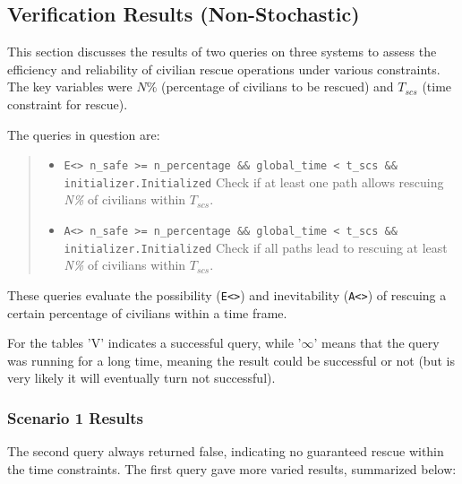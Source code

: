 \subsection{Verification Results (Non-Stochastic)}

This section discusses the results of two queries on three systems to assess the efficiency and reliability of civilian rescue operations under various constraints. The key variables were $N\%$ (percentage of civilians to be rescued) and $T_{scs}$ (time constraint for rescue).

The queries in question are:


\begin{quote}
	\raggedright
	\begin{itemize}
		\item \texttt{E<> n\_safe >= n\_percentage \&\& global\_time < t\_scs \&\& initializer.Initialized}\newline
                Check if at least one path allows rescuing \textit{N\%} of civilians within $T_{scs}$.
		\item \texttt{A<> n\_safe >= n\_percentage \&\& global\_time < t\_scs \&\& initializer.Initialized}\newline
                Check if all paths lead to rescuing at least \textit{N\%} of civilians within $T_{scs}$.
	\end{itemize}
\end{quote}

These queries evaluate the possibility (\texttt{E<>}) and inevitability (\texttt{A<>}) of rescuing a certain percentage of civilians within a time frame.

For the tables 'V' indicates a successful query, while '$\infty$' means that the query was running for a long time, meaning the result could be successful or not (but is very likely it will eventually turn not successful). 

\subsubsection{Scenario 1 Results}

The second query always returned false, indicating no guaranteed rescue within the time constraints.\newline
The first query gave more varied results, summarized below:

